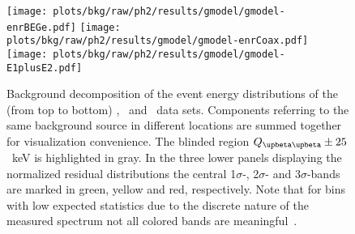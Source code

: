 \begin{sidewaystable}
  \centering
  \footnotesize
  \caption{%
    Summary of the analysis parameter estimates. Global mode and marginalized mode, along
    with its smallest 68\% C.I., are reported as representatives of the posterior
    parameter distribution. The number of reconstructed counts in the fit range and the
    background index at \qbb\ prior active background suppression are listed for each
    component and each analysis data set. The original type of prior distribution is
    marked with \m{[f]} for flat, \m{[g]} for Gaussian and \m{[e]} for exponential.
    ($\,^{\dagger}$ Tetratex\reg-coated)
  }\label{tab:bkg:raw:ph2:gmodel:results}
\end{sidewaystable}

\begin{figure}
  \centering
  \texttt{[image: plots/bkg/raw/ph2/results/gmodel/gmodel-enrBEGe.pdf]}
  \texttt{[image: plots/bkg/raw/ph2/results/gmodel/gmodel-enrCoax.pdf]}
  \texttt{[image: plots/bkg/raw/ph2/results/gmodel/gmodel-E1plusE2.pdf]}
  \caption{%
    Background decomposition of the event energy distributions of the (from top to bottom)
    \enrBEGeII, \enrCoaxII\ and \enrGeII\ data sets.  Components referring to the same
    background source in different locations are summed together for visualization
    convenience. The blinded region $\qbbM \pm 25$~keV is highlighted in gray. In the
    three lower panels displaying the normalized residual distributions the central
    1$\sigma$-, 2$\sigma$- and 3$\sigma$-bands are marked in green, yellow and red,
    respectively. Note that for bins with low expected statistics due to the discrete
    nature of the measured spectrum not all colored bands are
    meaningful~\cite{Aggarwal2011}.%
  }\label{fig:bkg:raw:ph2:gmodel:results}
\end{figure}


